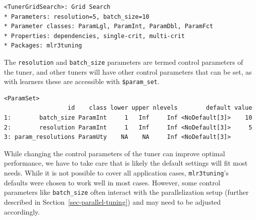 \begin{Shaded}
\begin{Highlighting}[]
\OtherTok{=} \NormalTok{(}\NormalTok{, } \NormalTok{, } \NormalTok{)}
\end{Highlighting}
\end{Shaded}

\begin{verbatim}
<TunerGridSearch>: Grid Search
* Parameters: resolution=5, batch_size=10
* Parameter classes: ParamLgl, ParamInt, ParamDbl, ParamFct
* Properties: dependencies, single-crit, multi-crit
* Packages: mlr3tuning
\end{verbatim}

The \texttt{resolution} and \texttt{batch\_size} parameters are termed
control
parameters of the tuner, and other tuners will have
other control parameters that can be set, as with learners these are
accessible with \texttt{\$param\_set}.

\begin{Shaded}
\begin{Highlighting}[]
\SpecialCharTok{$}
\end{Highlighting}
\end{Shaded}

\begin{verbatim}
<ParamSet>
                  id    class lower upper nlevels        default value
1:        batch_size ParamInt     1   Inf     Inf <NoDefault[3]>    10
2:        resolution ParamInt     1   Inf     Inf <NoDefault[3]>     5
3: param_resolutions ParamUty    NA    NA     Inf <NoDefault[3]>      
\end{verbatim}

While changing the control parameters of the tuner can improve optimal
performance, we have to take care that is likely the default settings
will fit most needs. While it is not possible to cover all application
cases, \texttt{mlr3tuning}'s defaults were chosen to work well in most
cases. However, some control parameters like \texttt{batch\_size} often
interact with the parallelization setup (further described in
Section~\ref{sec-parallel-tuning}) and may need to be adjusted
accordingly.

